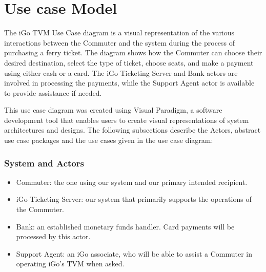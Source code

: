 \documentclass[letterpaper]{report}
\begin{document}
 \section{Use case Model}
The iGo TVM Use Case diagram is a visual representation of the various interactions between the Commuter and the system during the process of purchasing a ferry ticket. The diagram shows how the Commuter can choose their desired destination, select the type of ticket, choose seats, and make a payment using either cash or a card. The iGo Ticketing Server and Bank actors are involved in processing the payments, while the Support Agent actor is available to provide assistance if needed.

This use case diagram was created using Visual Paradigm, a software development tool that enables users to create visual representations of system architectures and designs. 
The following subsections describe the Actors, abstract use case packages and the use cases given in the use case diagram:

\subsubsection{System and Actors}
\begin{itemize}
    \item Commuter: the one using our system and our primary intended recipient.
    \item iGo Ticketing Server: our system that primarily supports the operations of the Commuter.
    \item Bank: an established monetary funds handler. Card payments will be processed by this actor.
    \item Support Agent: an iGo associate, who will be able to assist a Commuter in operating iGo's TVM when asked. 
\end{itemize}
\end{document}
